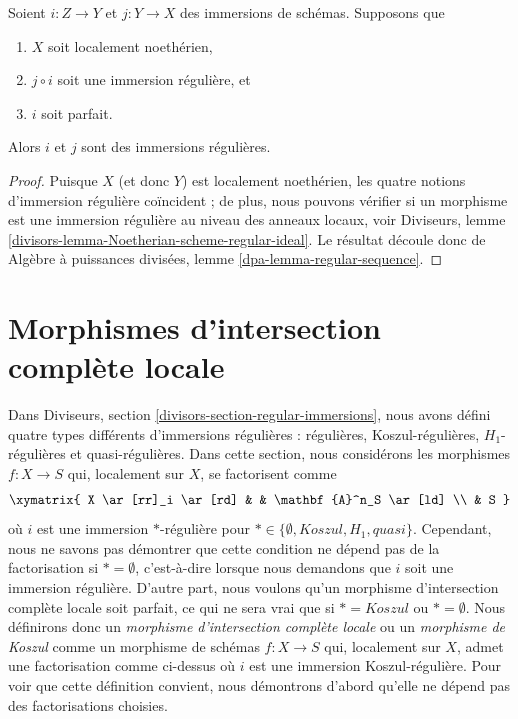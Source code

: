 \begin{lemma}
\label{lemma-factor-regular-immersion}
Soient $i : Z \to Y$ et $j : Y \to X$ des immersions de schémas.
Supposons que
\begin{enumerate}
\item $X$ soit localement noethérien,
\item $j \circ i$ soit une immersion régulière, et
\item $i$ soit parfait.
\end{enumerate}
Alors $i$ et $j$ sont des immersions régulières.
\end{lemma}

\begin{proof}
Puisque $X$ (et donc $Y$) est localement noethérien, les quatre notions d'immersion
régulière coïncident ; de plus, nous pouvons vérifier si un morphisme est une
immersion régulière au niveau des anneaux locaux, voir
Diviseurs, lemme \ref{divisors-lemma-Noetherian-scheme-regular-ideal}.
Le résultat découle donc de
Algèbre à puissances divisées, lemme \ref{dpa-lemma-regular-sequence}.
\end{proof}









\section{Morphismes d'intersection complète locale}
\label{section-lci}

\noindent
Dans
Diviseurs, section \ref{divisors-section-regular-immersions},
nous avons défini quatre types différents d'immersions régulières : régulières,
Koszul-régulières, $H_1$-régulières et quasi-régulières. Dans cette section,
nous considérons les morphismes $f : X \to S$ qui, localement sur $X$, se factorisent comme
$$
\xymatrix{
X \ar[rr]_i \ar[rd] & & \mathbf{A}^n_S \ar[ld] \\
& S
}
$$
où $i$ est une immersion $*$-régulière pour
$* \in \{\emptyset, Koszul, H_1, quasi\}$.
Cependant, nous ne savons pas démontrer que cette condition ne dépend pas
de la factorisation si $* = \emptyset$, c'est-à-dire lorsque nous demandons que $i$
soit une immersion régulière. D'autre part, nous voulons qu'un
morphisme d'intersection complète locale soit parfait, ce qui ne sera vrai
que si $* = Koszul$ ou $* = \emptyset$. Nous définirons donc un
{\it morphisme d'intersection complète locale} ou un
{\it morphisme de Koszul} comme un morphisme de schémas $f : X \to S$
qui, localement sur $X$, admet une factorisation comme ci-dessus où $i$ est une immersion
Koszul-régulière. Pour voir que cette définition convient, nous démontrons d'abord qu'elle ne dépend pas
des factorisations choisies.

